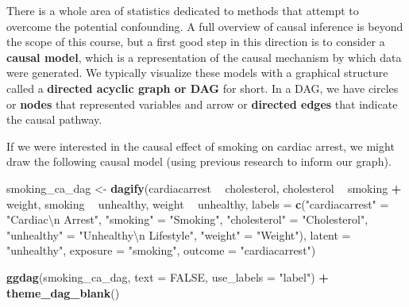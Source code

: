 \documentclass[]{book}
\newenvironment{Shaded}{\begin{snugshade}}{\end{snugshade}}
\newcommand{\CharTok}[1]{\textcolor[rgb]{0.31,0.60,0.02}{#1}}
\newcommand{\DataTypeTok}[1]{\textcolor[rgb]{0.13,0.29,0.53}{#1}}
\newcommand{\KeywordTok}[1]{\textcolor[rgb]{0.13,0.29,0.53}{\textbf{#1}}}
\newcommand{\NormalTok}[1]{#1}
\newcommand{\OperatorTok}[1]{\textcolor[rgb]{0.81,0.36,0.00}{\textbf{#1}}}
\newcommand{\OtherTok}[1]{\textcolor[rgb]{0.56,0.35,0.01}{#1}}
\newcommand{\StringTok}[1]{\textcolor[rgb]{0.31,0.60,0.02}{#1}}
\begin{document}
There is a whole area of statistics dedicated to methods that attempt to overcome the potential confounding. A full overview of causal inference is beyond the scope of this course, but a first good step in this direction is to consider a \textbf{causal model}, which is a representation of the causal mechanism by which data were generated. We typically visualize these models with a graphical structure called a \textbf{directed acyclic graph or DAG} for short. In a DAG, we have circles or \textbf{nodes} that represented variables and arrow or \textbf{directed edges} that indicate the causal pathway.

If we were interested in the causal effect of smoking on cardiac arrest, we might draw the following causal model (using previous research to inform our graph).

\begin{Shaded}
\begin{Highlighting}[]
\NormalTok{smoking_ca_dag <-}\StringTok{ }\KeywordTok{dagify}\NormalTok{(cardiacarrest }\OperatorTok{~}\StringTok{ }\NormalTok{cholesterol,}
\NormalTok{       cholesterol }\OperatorTok{~}\StringTok{ }\NormalTok{smoking }\OperatorTok{+}\StringTok{ }\NormalTok{weight,}
\NormalTok{       smoking }\OperatorTok{~}\StringTok{ }\NormalTok{unhealthy,}
\NormalTok{       weight }\OperatorTok{~}\StringTok{ }\NormalTok{unhealthy,}
       \DataTypeTok{labels =} \KeywordTok{c}\NormalTok{(}\StringTok{"cardiacarrest"}\NormalTok{ =}\StringTok{ "Cardiac}\CharTok{\textbackslash{}n}\StringTok{ Arrest"}\NormalTok{, }
                  \StringTok{"smoking"}\NormalTok{ =}\StringTok{ "Smoking"}\NormalTok{,}
                  \StringTok{"cholesterol"}\NormalTok{ =}\StringTok{ "Cholesterol"}\NormalTok{,}
                  \StringTok{"unhealthy"}\NormalTok{ =}\StringTok{ "Unhealthy}\CharTok{\textbackslash{}n}\StringTok{ Lifestyle"}\NormalTok{,}
                  \StringTok{"weight"}\NormalTok{ =}\StringTok{ "Weight"}\NormalTok{),}
       \DataTypeTok{latent =} \StringTok{"unhealthy"}\NormalTok{,}
       \DataTypeTok{exposure =} \StringTok{"smoking"}\NormalTok{,}
       \DataTypeTok{outcome =} \StringTok{"cardiacarrest"}\NormalTok{)}

\KeywordTok{ggdag}\NormalTok{(smoking_ca_dag, }\DataTypeTok{text =} \OtherTok{FALSE}\NormalTok{, }\DataTypeTok{use_labels =} \StringTok{"label"}\NormalTok{) }\OperatorTok{+}
\StringTok{  }\KeywordTok{theme_dag_blank}\NormalTok{()}
\end{Highlighting}
\end{Shaded}
\end{document}
